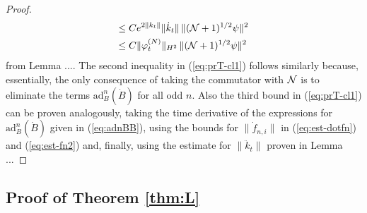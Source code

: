\documentclass[11pt,a4paper,DIV11]{scrartcl}	%
\newcommand{\cN}{{\cal N}}
\begin{document}
\begin{proof}
\[\begin{split}
\leq \; & C e^{2\| k_t \|} \| \dot{k}_t \| \, \| (\cN+1)^{1/2} \psi \|^2 \\
\leq \; & C \| \varphi_t^{(N)} \|_{H^2} \, \| (\cN+1)^{1/2} \psi \|^2 
\end{split}
\]
from Lemma .... The second inequality in (\ref{eq:prT-cl1}) follows similarly because, essentially, the only consequence of taking the commutator with $\cN$ is to eliminate the terms $\text{ad}^n_B (\dot{B})$ for all odd $n$. Also the third bound in (\ref{eq:prT-cl1}) can be proven analogously, taking the time derivative of the expressions for $\text{ad}^n_B (\dot{B})$ given in (\ref{eq:adnBB}), using the bounds for $\| \dot f_{n,i} \|$ in (\ref{eq:est-dotfn}) and (\ref{eq:est-fn2}) and, finally, using the estimate for $\| \ddot k_t \|$ proven in Lemma ...
\end{proof}

\subsection{Proof of Theorem \ref{thm:L}}
\end{document}
